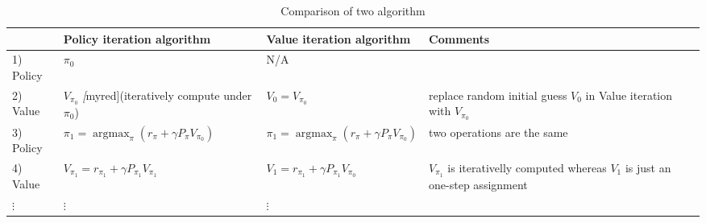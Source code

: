 \begin{table}
	\caption{Comparison of two algorithm}
	\begin{tabular}{m{4em}m{14em}m{14em}@{}m{14em}}
		\toprule
		          & Policy iteration algorithm                                    & Value iteration algorithm                                     & Comments                                                                          \\[6pt]
		\midrule
		1) Policy & $\pi_0$                                                       & N/A                                                           &                                                                                   \\[6pt]
		2) Value  & $V_{\pi_0}$ \emph[myred]{(iteratively compute under $\pi_0$)} & $V_0=V_{\pi_0}$                                               & replace random initial guess $V_0$ in Value iteration with $V_{\pi_0}$            \\[6pt]
		3) Policy & $\pi_1=\mathop{\arg \max}_\pi (r_\pi+\gamma P_\pi V_{\pi_0})$ & $\pi_1=\mathop{\arg \max}_\pi (r_\pi+\gamma P_\pi V_{\pi_0})$ & two operations are the same                                                       \\[6pt]
		4) Value  & $V_{\pi_1}=r_{\pi_1}+\gamma P_{\pi_1}V_{\pi_1}$               & $ V_1=r_{\pi_1}+\gamma P_{\pi_1}V_{\pi_0}$                    & $V_{\pi_1}$ is iterativelly computed whereas $V_1$ is just an one-step assignment \\
		$\vdots$  & $\vdots$                                                      & $\vdots$                                                      &                                                                                   \\[6pt]
		\bottomrule
	\end{tabular}
\end{table}

